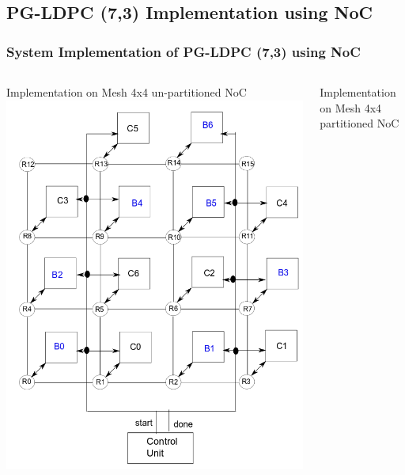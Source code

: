 \subsection{PG-LDPC (7,3) Implementation using NoC}
\begin{frame}
\frametitle{System Implementation of PG-LDPC (7,3) using NoC}
\begin{columns}[c]
\column{2.2in}  %
\begin{center}
Implementation on Mesh 4x4 un-partitioned NoC
\includegraphics[scale=0.16]{./diagram/ldpc_7x7_noc_mesh_4x4}
\end{center}
\column{2.4in}
\begin{center}
Implementation on Mesh 4x4 partitioned NoC

\end{center}
\end{columns}
\end{frame}
